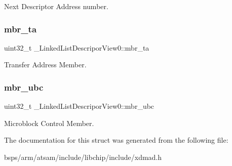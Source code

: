 Next Descriptor Address number. \mbox{\label{struct__LinkedListDescriporView0_a9f9416e944804c20e7e3add5dff02b44}} 
\subsubsection{\texorpdfstring{mbr\_ta}{mbr\_ta}}
{\footnotesize\ttfamily uint32\+\_\+t \+\_\+\+Linked\+List\+Descripor\+View0\+::mbr\+\_\+ta}

Transfer Address Member. \mbox{\label{struct__LinkedListDescriporView0_afd9e646d053432881d446251ef7abe63}} 
\subsubsection{\texorpdfstring{mbr\_ubc}{mbr\_ubc}}
{\footnotesize\ttfamily uint32\+\_\+t \+\_\+\+Linked\+List\+Descripor\+View0\+::mbr\+\_\+ubc}

Microblock Control Member. 

The documentation for this struct was generated from the following file\+:\begin{DoxyCompactItemize}
\item 
bsps/arm/atsam/include/libchip/include/xdmad.\+h\end{DoxyCompactItemize}
